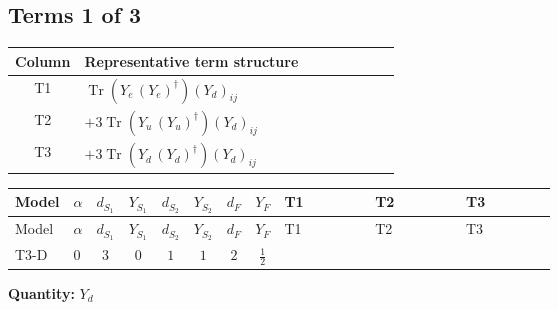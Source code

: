 \documentclass[8pt]{article}
\begin{document}
\begin{landscape}
\subsection*{Terms 1 of 3}
\begin{center}
\begin{tabular}{@{}c >{\raggedright\arraybackslash}p{0.82\linewidth}@{}}
\toprule
Column & Representative term structure \\
\midrule
T1 & \(\displaystyle \operatorname{Tr}\!\left({Y_e}\,\left({Y_e}\right)^{\dagger}\right) \left({Y_d}\right)_{ij}\) \\
\midrule
T2 & \(\displaystyle +3 \operatorname{Tr}\!\left({Y_u}\,\left({Y_u}\right)^{\dagger}\right) \left({Y_d}\right)_{ij}\) \\
\midrule
T3 & \(\displaystyle +3 \operatorname{Tr}\!\left({Y_d}\,\left({Y_d}\right)^{\dagger}\right) \left({Y_d}\right)_{ij}\) \\
\midrule
\bottomrule
\end{tabular}
\end{center}
\smallskip
\tiny
\begin{longtable}{@{}llcccccc >{\raggedright\arraybackslash}p{0.21\linewidth} >{\raggedright\arraybackslash}p{0.21\linewidth} >{\raggedright\arraybackslash}p{0.21\linewidth}@{}}
\toprule
Model & $\alpha$ & $d_{S_1}$ & $Y_{S_1}$ & $d_{S_2}$ & $Y_{S_2}$ & $d_F$ & $Y_F$ & T1 & T2 & T3 \\
\midrule
\endfirsthead
\toprule
Model & $\alpha$ & $d_{S_1}$ & $Y_{S_1}$ & $d_{S_2}$ & $Y_{S_2}$ & $d_F$ & $Y_F$ & T1 & T2 & T3 \\
\midrule
\endhead
T3-D & $0$ & $3$ & $0$ & $1$ & $1$ & $2$ & $\frac{1}{2}$ & \scriptsize\adjustbox{max width=\linewidth}{$\begin{gathered} \operatorname{Tr}\!\left({Y_e}\,\left({Y_e}\right)^{\dagger}\right) \left({Y_d}\right)_{ij}\end{gathered}$} & \scriptsize\adjustbox{max width=\linewidth}{$\begin{gathered} +3 \operatorname{Tr}\!\left({Y_u}\,\left({Y_u}\right)^{\dagger}\right) \left({Y_d}\right)_{ij}\end{gathered}$} & \scriptsize\adjustbox{max width=\linewidth}{$\begin{gathered} +3 \operatorname{Tr}\!\left({Y_d}\,\left({Y_d}\right)^{\dagger}\right) \left({Y_d}\right)_{ij}\end{gathered}$} \\
\midrule
\bottomrule
\end{longtable}
\clearpage
\noindent\textbf{Quantity: }$Y_d$\par\smallskip

\end{landscape}
\end{document}

